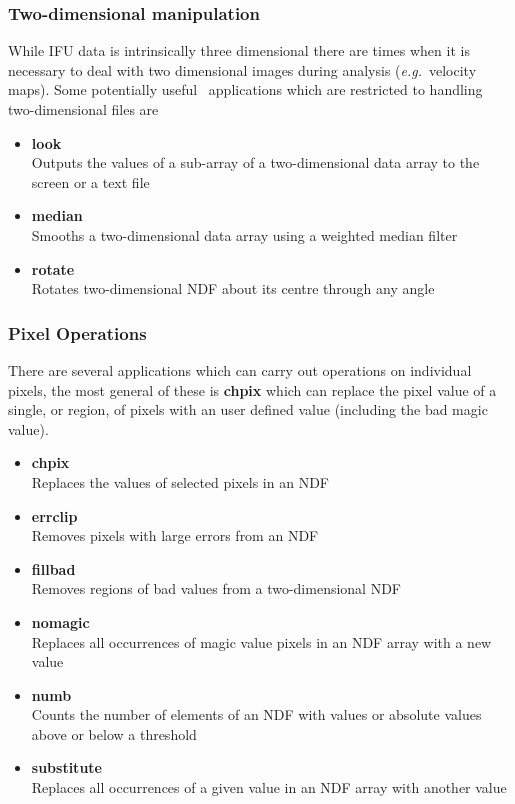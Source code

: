 \documentclass[twoside,11pt]{article}
\newcommand{\xref}[3]{#1}
\begin{document}
\begin{\htmlonly}
{\subsubsection{Two-dimensional manipulation}

While IFU data is intrinsically three dimensional there are times when
it is necessary to deal with two dimensional images during analysis
(\emph{e.g.}\ velocity maps).  Some potentially useful \KAPPA\
applications which are restricted to handling two-dimensional files
are

\begin{itemize}
\item{\xref{{\bf look}}{sun95}{LOOK}}\\
Outputs the values of a sub-array of a two-dimensional data array to the screen or a text file
\item{\xref{{\bf median}}{sun95}{MEDIAN}}\\ 
Smooths a two-dimensional data array using a weighted median filter 
\item{\xref{{\bf rotate}}{sun95}{ROTATE}}\\
Rotates two-dimensional NDF about its centre through any angle 
\end{itemize}
 
\subsubsection{Pixel Operations}

There are several applications which can carry out operations on
individual pixels, the most general of these is \xref{{\bf
chpix}}{sun95}{CHPIX} which can replace the pixel value of a single,
or region, of pixels with an user defined value (including the bad
\xref{magic value}{sun95}{se_masking}).

\begin{itemize}
\item{\xref{{\bf chpix}}{sun95}{CHPIX}}\\ 
Replaces the values of selected pixels in an NDF 
\item{\xref{{\bf errclip}}{sun95}{ERRCLIP}}\\ 
Removes pixels with large errors from an NDF 
\item{\xref{{\bf fillbad}}{sun95}{FILLBAD}}\\ 
Removes regions of bad values from a two-dimensional NDF 
\item{\xref{{\bf nomagic}}{sun95}{NOMAGIC}}\\ 
Replaces all occurrences of \xref{magic value}{sun95}{se_masking} 
pixels in an NDF array with a new value 
\item{\xref{{\bf numb}}{sun95}{NUMB}}\\ 
Counts the number of elements of an NDF with values or absolute values above or below a threshold 
\item{\xref{{\bf substitute}}{sun95}{SUBSTITUTE}}\\
Replaces all occurrences of a given value in an NDF array with another value 
\end{itemize}

}
\end{\htmlonly}
\end{document}
